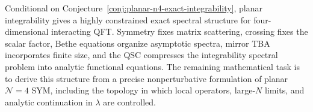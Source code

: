 Conditional on
Conjecture~\ref{conj:planar-n4-exact-integrability}, planar integrability
gives a highly constrained exact spectral structure for four-dimensional
interacting QFT.  Symmetry fixes matrix scattering, crossing fixes the scalar
factor, Bethe equations organize asymptotic spectra, mirror TBA incorporates
finite size, and the QSC compresses the integrability spectral problem into
analytic functional equations.  The remaining mathematical task is to derive
this structure from a precise nonperturbative formulation of planar
\(\mathcal N=4\) SYM, including the topology in which local operators,
large-\(N\) limits, and analytic continuation in \(\lambda\) are controlled.
